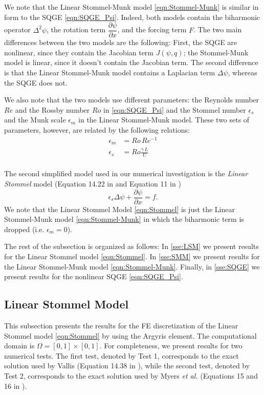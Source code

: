 We note that the Linear Stommel-Munk model \eqref{eqn:Stommel-Munk} is similar
in form to the SQGE \eqref{eqn:SQGE_Psi}. Indeed, both models contain the
biharmonic operator $\Delta^2 \psi$, the rotation term $\dfrac{\partial
\psi}{\partial x}$, and the forcing term $F$. The two main differences between
the two models are the following: First, the SQGE are nonlinear, since they
contain the Jacobian term $J(\psi,q)$; the Stommel-Munk model is linear, since
it doesn't contain the Jacobian term. The second difference is that the Linear
Stommel-Munk model contains a Laplacian term $\Delta \psi$, whereas the SQGE
does not.

We also note that the two models use different parameters: the Reynolds number
$Re$ and the Rossby number $Ro$ in \eqref{eqn:SQGE_Psi} and the Stommel number
$\epsilon_s$ and the Munk scale $\epsilon_m$ in the Linear Stommel-Munk model.
These two sets of parameters, however, are related by the following relations:
\begin{align}
  \epsilon_m &= Ro\, Re^{-1} \label{eqn:MunkScale}\\
  \epsilon_s &= Ro \frac{\gamma\, L}{U} \label{eqn:StommelNumber}\\
\end{align}

The second simplified model used in our numerical investigation is the
\emph{Linear Stommel} model (Equation 14.22 in \cite{Vallis06} and Equation 11
in \cite{Myers})
\begin{equation}
  \epsilon_s \Delta \psi + \frac{\partial \psi}{\partial x} = f.
  \label{eqn:Stommel}
\end{equation}
We note that the Linear Stommel Model \eqref{eqn:Stommel} is just the Linear
Stommel-Munk model \eqref{eqn:Stommel-Munk} in which the biharmonic term is
dropped (i.e. $\epsilon_m=0$).

The rest of the subsection is organized as follows: In \autoref{sse:LSM} we
present results for the Linear Stommel model \eqref{eqn:Stommel}. In
\autoref{sse:SMM} we present results for the Linear Stommel-Munk model
\eqref{eqn:Stommel-Munk}. Finally, in \autoref{sse:SQGE} we present results for
the nonlinear SQGE \eqref{eqn:SQGE_Psi}.

\subsection{Linear Stommel Model} \label{sse:LSM} This subsection presents the
results for the FE discretization of the Linear Stommel model
\eqref{eqn:Stommel} by using the Argyris element. The computational domain is
$\Omega = [0,1]\times [0,1]$. For completeness, we present results for two
numerical tests. The first test, denoted by Test 1, corresponds to the exact
solution used by Vallis (Equation 14.38 in \cite{Vallis06}), while the second
test, denoted by Test 2, corresponds to the exact solution used by Myers
\emph{et al.} (Equations 15 and 16 in \cite{Myers}).

